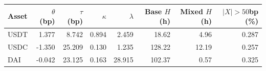 \begin{tabular}{lrrrrrrr}
\toprule
Asset & $\theta$ (bp) & $\tau$ (bp) & $\kappa$ & $\lambda$ & Base $H$ (h) & Mixed $H$ (h) & $|X|>50$bp (\%)\\
\midrule
USDT & 1.377 & 8.742 & 0.894 & 2.459 & 18.62 & 4.96 & 0.287 \tabularnewline
USDC & -1.350 & 25.209 & 0.130 & 1.235 & 128.22 & 12.19 & 0.257 \tabularnewline
DAI & -0.042 & 23.125 & 0.163 & 28.915 & 102.37 & 0.57 & 0.325 \tabularnewline
\bottomrule
\end{tabular}
